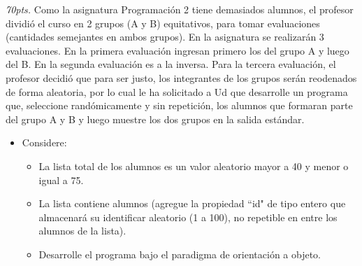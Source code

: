 \documentclass[10pt]{article}
\begin{document}
\begin{enumerate}
{\begin{multicols}{2}
\end{multicols}
}
\newpage
   {\scriptsize
\item \emph{70pts.} Como la asignatura Programaci\'on 2 tiene demasiados alumnos, el profesor dividi\'o el curso en 2 grupos (A y B) equitativos, para tomar evaluaciones (cantidades semejantes en ambos grupos). En la asignatura se realizar\'an 3 evaluaciones. En la primera evaluaci\'on ingresan primero los del grupo A y luego del B. En la segunda evaluaci\'on es a la inversa. Para la tercera evaluaci\'on, el profesor decidi\'o que para ser justo, los integrantes de los grupos ser\'an reodenados de forma aleatoria, por lo cual le ha solicitado a Ud que desarrolle un programa que, seleccione rand\'omicamente y sin repetici\'on, los alumnos que formaran parte del grupo A y B y luego muestre los dos grupos en la salida est\'andar.
}
\begin{itemize}   
    \item[] {\scriptsize Considere: }
    \begin{itemize}
        \item {\scriptsize La lista total de los alumnos es un valor aleatorio mayor a 40 y menor o igual a 75.}
        \item {\scriptsize La lista contiene alumnos (agregue la propiedad ``id" de tipo entero que almacenar\'a su identificar aleatorio (1 a 100), no repetible en entre los alumnos de la lista).}
        \item {\scriptsize Desarrolle el programa bajo el paradigma de orientación a objeto.}
    \end{itemize}
\end{itemize}
\end{enumerate}
\end{document}
